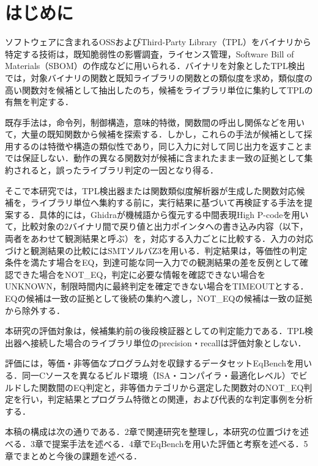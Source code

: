 \section{はじめに}

ソフトウェアに含まれるOSSおよびThird-Party Library（TPL）をバイナリから特定する技術は，既知脆弱性の影響調査，ライセンス管理，Software Bill of Materials（SBOM）の作成などに用いられる．バイナリを対象としたTPL検出では，対象バイナリの関数と既知ライブラリの関数との類似度を求め，類似度の高い関数対を候補として抽出したのち，候補をライブラリ単位に集約してTPLの有無を判定する．

既存手法は，命令列，制御構造，意味的特徴，関数間の呼出し関係などを用いて，大量の既知関数から候補を探索する．しかし，これらの手法が候補として採用するのは特徴や構造の類似性であり，同じ入力に対して同じ出力を返すことまでは保証しない．動作の異なる関数対が候補に含まれたまま一致の証拠として集約されると，誤ったライブラリ判定の一因となり得る．

そこで本研究では，TPL検出器または関数類似度解析器が生成した関数対応候補を，ライブラリ単位へ集約する前に，実行結果に基づいて再検証する手法を提案する．具体的には，Ghidraが機械語から復元する中間表現High P-codeを用いて，比較対象の2バイナリ間で戻り値と出力ポインタへの書き込み内容（以下，両者をあわせて観測結果と呼ぶ）を，対応する入力ごとに比較する．入力の対応づけと観測結果の比較にはSMTソルバZ3を用いる．判定結果は，等価性の判定条件を満たす場合をEQ，到達可能な同一入力での観測結果の差を反例として確認できた場合をNOT\_EQ，判定に必要な情報を確認できない場合をUNKNOWN，制限時間内に最終判定を確定できない場合をTIMEOUTとする．EQの候補は一致の証拠として後続の集約へ渡し，NOT\_EQの候補は一致の証拠から除外する．

本研究の評価対象は，候補集約前の後段検証器としての判定能力である．TPL検出器へ接続した場合のライブラリ単位のprecision・recallは評価対象としない．

評価には，等価・非等価なプログラム対を収録するデータセットEqBench\cite{eqbench}を用いる．同一Cソースを異なるビルド環境（ISA・コンパイラ・最適化レベル）でビルドした関数間のEQ判定と，非等価カテゴリから選定した関数対のNOT\_EQ判定を行い，判定結果とプログラム特徴との関連，および代表的な判定事例を分析する．

本稿の構成は次の通りである．2章で関連研究を整理し，本研究の位置づけを述べる．3章で提案手法を述べる．4章でEqBenchを用いた評価と考察を述べる．5章でまとめと今後の課題を述べる．
